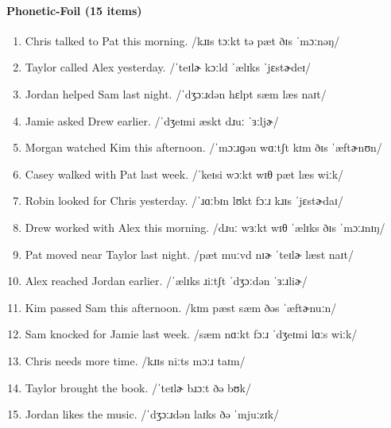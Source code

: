 \documentclass[12pt]{article}
\begin{document}
\paragraph{Phonetic-Foil (15 items)}
\begin{enumerate}
\item Chris talked to Pat this morning. /kɹɪs tɔːkt tə pæt ðɪs ˈmɔːnəŋ/
\item Taylor called Alex yesterday. /ˈteɪlɚ kɔːld ˈælɪks ˈjɛstɚdeɪ/
\item Jordan helped Sam last night. /ˈdʒɔːɹdən hɛlpt sæm læs naɪt/
\item Jamie asked Drew earlier. /ˈdʒeɪmi æskt dɹuː ˈɜːljɚ/
\item Morgan watched Kim this afternoon. /ˈmɔːɹɡən wɑːtʃt kɪm ðɪs ˈæftɚnʊn/
\item Casey walked with Pat last week. /ˈkeɪsi wɔːkt wɪθ pæt læs wiːk/
\item Robin looked for Chris yesterday. /ˈɹɑːbɪn lʊkt fɔːɹ kɹɪs ˈjɛstɚdaɪ/
\item Drew worked with Alex this morning. /dɹuː wɜːkt wɪθ ˈælɪks ðɪs ˈmɔːɹnɪŋ/
\item Pat moved near Taylor last night. /pæt muːvd nɪɚ ˈteɪlɚ læst naɪt/
\item Alex reached Jordan earlier. /ˈælɪks ɹiːtʃt ˈdʒɔːdən ˈɜːɹliɚ/
\item Kim passed Sam this afternoon. /kɪm pæst sæm ðəs ˈæftɚnuːn/
\item Sam knocked for Jamie last week. /sæm nɑːkt fɔːɹ ˈdʒeɪmi lɑːs wiːk/
\item Chris needs more time. /kɹɪs niːts mɔːɹ taɪm/
\item Taylor brought the book. /ˈteɪlɚ bɹɔːt ðə bʊk/
\item Jordan likes the music. /ˈdʒɔːɹdən laɪks ðə ˈmjuːzɪk/
\end{enumerate}
\end{document}
